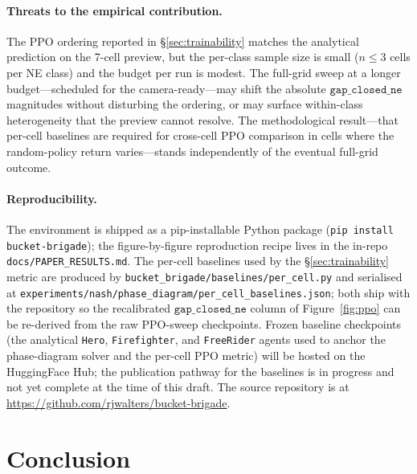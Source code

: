 \documentclass{anvil-paper}
\begin{document}
\paragraph{Threats to the empirical contribution.}
The PPO ordering reported in \S\ref{sec:trainability} matches the
analytical prediction on the 7-cell preview, but the per-class
sample size is small ($n\leq 3$ cells per NE class) and the budget per
run is modest. The full-grid sweep at a longer budget---scheduled for the
camera-ready---may shift the absolute $\texttt{gap\_closed\_ne}$ magnitudes
without disturbing the ordering, or may surface within-class
heterogeneity that the preview cannot resolve. The methodological
result---that per-cell baselines are required for cross-cell PPO comparison
in cells where the random-policy return varies---stands independently of
the eventual full-grid outcome.

\paragraph{Reproducibility.}
The environment is shipped as a pip-installable Python package
(\texttt{pip install bucket-brigade}); the figure-by-figure reproduction
recipe lives in the in-repo \texttt{docs/PAPER\_RESULTS.md}. The per-cell
baselines used by the \S\ref{sec:trainability} metric are produced by
\texttt{bucket\_brigade/baselines/per\_cell.py} and serialised at
\texttt{experiments/nash/phase\_diagram/per\_cell\_baselines.json}; both
ship with the repository so the recalibrated $\texttt{gap\_closed\_ne}$
column of Figure~\ref{fig:ppo} can be re-derived from the raw PPO-sweep
checkpoints.
Frozen baseline checkpoints (the analytical \texttt{Hero},
\texttt{Firefighter}, and \texttt{FreeRider} agents used to anchor the
phase-diagram solver and the per-cell PPO metric) will be hosted on the
HuggingFace Hub; the publication pathway for the baselines is in progress
and not yet complete at the time of this draft. The source repository is at
\url{https://github.com/rjwalters/bucket-brigade}.

\section*{Conclusion}
\end{document}
